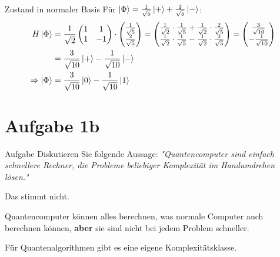 \documentclass[fleqn,compress,utf8,aspectratio=169,t]{beamer}
\begin{document}
\begin{frame}{Zustand in normaler Basis}
Für $\ket{\Phi} = \frac{1}{\sqrt5} \ket{+} + \frac{2}{\sqrt5} \ket{-}$:
\[
\begin{aligned}
H \ket{\Phi}
&= \frac{1}{\sqrt2}
\begin{pmatrix}
1 & 1 \\
1 & -1 \\
\end{pmatrix}
\cdot
\begin{pmatrix}
\frac{1}{\sqrt{5}} \\
\frac{2}{\sqrt{5}} \\
\end{pmatrix}
=
\begin{pmatrix}
\frac{1}{\sqrt{2}} \cdot \frac{1}{\sqrt{5}} + \frac{1}{\sqrt{2}} \cdot \frac{2}{\sqrt{5}} \\
\frac{1}{\sqrt{2}} \cdot \frac{1}{\sqrt{5}} - \frac{1}{\sqrt{2}} \cdot \frac{2}{\sqrt{5}} \\
\end{pmatrix}
=
\begin{pmatrix}
\frac{3}{\sqrt{10}} \\
-\frac{1}{\sqrt{10}} \\
\end{pmatrix}
\\
&=
\frac{3}{\sqrt{10}} \ket{+} - \frac{1}{\sqrt{10}} \ket{-}
\\
\Rightarrow \ket{\Phi} &= \frac{3}{\sqrt{10}} \ket{0} - \frac{1}{\sqrt{10}} \ket{1}
\end{aligned}
\]
\end{frame}

\section{Aufgabe 1b}

\begin{frame}{Aufgabe}
Diskutieren Sie folgende Aussage: \textit{"Quantencomputer sind einfach schnellere Rechner, die Probleme beliebiger Komplexität
im Handumdrehen lösen."}
\end{frame}

\begin{frame}
Das stimmt nicht.

Quantencomputer können alles berechnen, was normale Computer auch berechnen können, \textbf{aber} sie sind nicht bei jedem Problem schneller.

Für Quantenalgorithmen gibt es eine eigene Komplexitätsklasse.

\end{frame}
\end{document}

